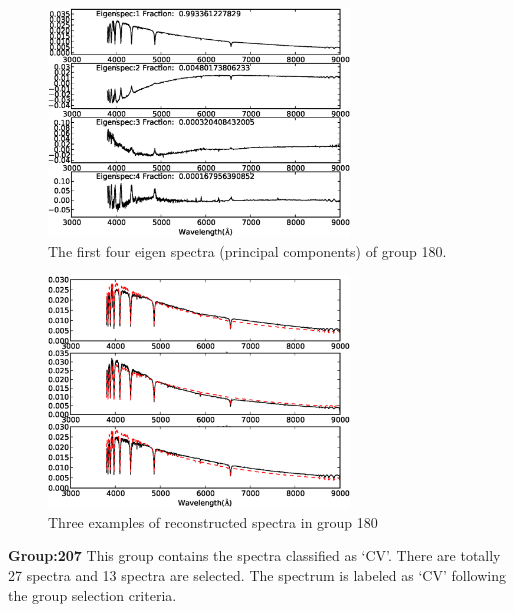\documentclass[referee]{raa}            %
\begin{document}
 \begin{figure}
   \centering
   \includegraphics[width=8cm, angle=0,clip]{f72.eps}
   \caption{The first four eigen spectra (principal components) of group 180.
   }
   \label{Fig72}
\end{figure}

 \begin{figure}
   \centering
   \includegraphics[width=8cm, angle=0,clip]{f82.eps}
   \caption{Three examples of reconstructed spectra in group 180
   }
   \label{Fig82}
\end{figure}


\textbf{Group:207}
This group contains the spectra classified as `CV'.
There are totally 27 spectra and 13 spectra are selected.
The spectrum is labeled as `CV' following the group selection criteria.
\end{document}
